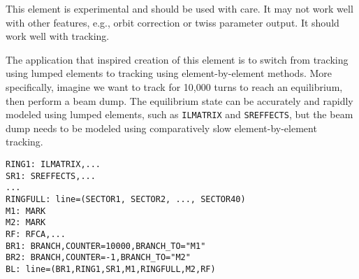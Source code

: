 This element is experimental and should be used with care.
It may not work well with other features, e.g., orbit correction or twiss parameter output.
It should work well with tracking.

The application that inspired creation of this element is to switch from tracking using lumped elements to tracking
using element-by-element methods.
More specifically, imagine we want to track for 10,000 turns to reach an equilibrium, then perform a beam dump.
The equilibrium state can be accurately and rapidly modeled using lumped elements, such as \verb|ILMATRIX| and \verb|SREFFECTS|,
but the beam dump needs to be modeled using comparatively slow element-by-element tracking.
\begin{verbatim}
RING1: ILMATRIX,...
SR1: SREFFECTS,...
...
RINGFULL: line=(SECTOR1, SECTOR2, ..., SECTOR40)
M1: MARK
M2: MARK
RF: RFCA,...
BR1: BRANCH,COUNTER=10000,BRANCH_TO="M1"
BR2: BRANCH,COUNTER=-1,BRANCH_TO="M2"
BL: line=(BR1,RING1,SR1,M1,RINGFULL,M2,RF)
\end{verbatim}
